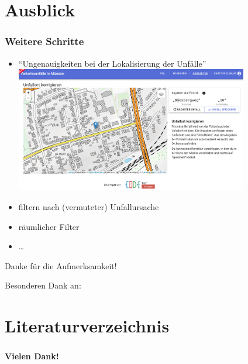 \documentclass{beamer}
\begin{document}
\section{Ausblick}

\begin{frame}
  \frametitle{Weitere Schritte}
  
  \centering  
  
  \begin{itemize}
    \item "`Ungenauigkeiten bei der Lokalisierung der Unfälle"' \cite[S.~38]{Baier2018}
    \includegraphics[width=0.8\textwidth]{img/editor-screenshot.png}
    \item filtern nach (vermuteter) Unfallursache
    \item räumlicher Filter
    \item \ldots
  \end{itemize}
\end{frame}

\begin{frame}
  Danke für die Aufmerksamkeit!
  
  Besonderen Dank an:

\end{frame}

\section{Literaturverzeichnis}
\begin{frame}[plain]%
  \frametitle{\secname{}} %
	\begin{center}
		\LARGE\textbf{Vielen Dank!}
	\end{center}
	
% 		
  
	
\end{frame}

\setcounter{finalframe}{\value{framenumber}}
\appendix
\begin{frame}
\end{frame}
\setcounter{framenumber}{\value{finalframe}}
\end{document}
